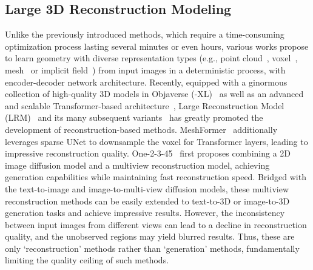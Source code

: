 \subsection{Large 3D Reconstruction Modeling}
Unlike the previously introduced methods, which require a time-consuming optimization process lasting several minutes or even hours, various works propose to learn geometry with diverse representation types (e.g., point cloud~\cite{DBLP:conf/cvpr/FanSG17,DBLP:conf/cvpr/WuZXZC20}, voxel~\cite{DBLP:conf/eccv/GirdharFRG16,DBLP:conf/nips/0001WXSFT17}, mesh~\cite{DBLP:conf/eccv/WangZLFLJ18,DBLP:conf/cvpr/WorchelDHSFE22} or implicit field~\cite{DBLP:conf/cvpr/MeschederONNG19,DBLP:conf/nips/XuWCMN19,DBLP:conf/cvpr/YuYTK21}) from input images in a deterministic process, with encoder-decoder network architecture.
Recently, equipped with a ginormous collection of high-quality 3D models in Objaverse (-XL)~\cite{deitke2023objaverse,deitke2024objaverse} as well as an advanced and scalable Transformer-based architecture~\cite{DBLP:conf/nips/VaswaniSPUJGKP17}, Large Reconstruction Model (LRM)~\cite{hong2023lrm} and its many subsequent variants~\cite{xu2023dmv3d,wang2023pf,li2023instant3d,zhang2024gs,zou2024triplane,wei2024meshlrm,xu2024instantmesh,tochilkin2024triposr} has greatly promoted the development of reconstruction-based methods.
MeshFormer~\cite{DBLP:journals/corr/abs-2408-10198} additionally leverages sparse UNet to downsample the voxel for Transformer layers, leading to impressive reconstruction quality.
One-2-3-45~\cite{DBLP:conf/nips/LiuXJCTXS23} first proposes combining a 2D image diffusion model and a multiview reconstruction model, achieving generation capabilities while maintaining fast reconstruction speed.
Bridged with the text-to-image and image-to-multi-view diffusion models, these multiview reconstruction methods can be easily extended to text-to-3D or image-to-3D generation tasks and achieve impressive results.
However, the inconsistency between input images from different views can lead to a decline in reconstruction quality, and the unobserved regions may yield blurred results.
Thus, these are only `reconstruction' methods rather than `generation' methods, fundamentally limiting the quality ceiling of such methods.

